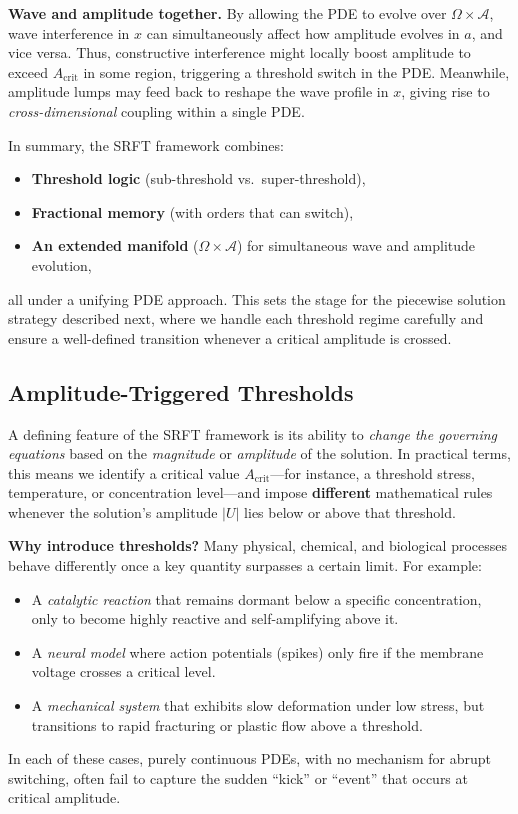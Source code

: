 \documentclass[12pt]{article}
\begin{document}
\noindent
\textbf{Wave and amplitude together.}
By allowing the PDE to evolve over $\Omega \times \mathcal{A}$, wave interference
in $x$ can simultaneously affect how amplitude evolves in $a$, and vice versa.
Thus, constructive interference might locally boost amplitude to exceed
$A_{\mathrm{crit}}$ in some region, triggering a threshold switch in the PDE.
Meanwhile, amplitude lumps may feed back to reshape the wave profile in $x$,
giving rise to \emph{cross-dimensional} coupling within a single PDE.

\medskip

\noindent
In summary, the SRFT framework combines:
\begin{itemize}
    \item \textbf{Threshold logic} (sub-threshold vs.\ super-threshold),
    \item \textbf{Fractional memory} (with orders that can switch),
    \item \textbf{An extended manifold} (\(\Omega \times \mathcal{A}\))
          for simultaneous wave and amplitude evolution,
\end{itemize}
all under a unifying PDE approach. This sets the stage for the piecewise solution
strategy described next, where we handle each threshold regime carefully and
ensure a well-defined transition whenever a critical amplitude is crossed.

\subsection{Amplitude-Triggered Thresholds}
\label{subsec:amplitude_thresholds}

A defining feature of the SRFT framework is its ability to \emph{change the governing
equations} based on the \emph{magnitude} or \emph{amplitude} of the solution. In
practical terms, this means we identify a critical value $A_{\mathrm{crit}}$—for
instance, a threshold stress, temperature, or concentration level—and impose
\textbf{different} mathematical rules whenever the solution’s amplitude $|U|$ lies
below or above that threshold.

\medskip

\noindent
\textbf{Why introduce thresholds?}
Many physical, chemical, and biological processes behave differently once a key
quantity surpasses a certain limit. For example:
\begin{itemize}
    \item A \emph{catalytic reaction} that remains dormant below a specific
          concentration, only to become highly reactive and self-amplifying above it.
    \item A \emph{neural model} where action potentials (spikes) only fire if the
          membrane voltage crosses a critical level.
    \item A \emph{mechanical system} that exhibits slow deformation under low stress,
          but transitions to rapid fracturing or plastic flow above a threshold.
\end{itemize}
In each of these cases, purely continuous PDEs, with no mechanism for abrupt
switching, often fail to capture the sudden “kick” or “event” that occurs at
critical amplitude.
\end{document}
